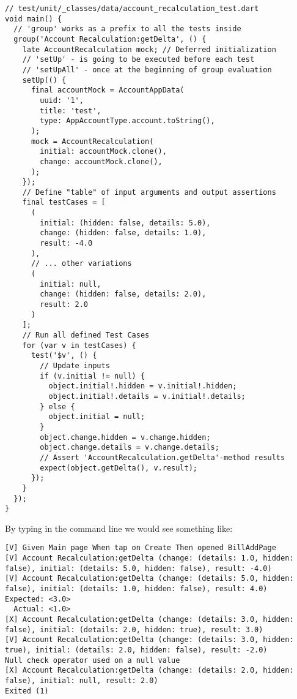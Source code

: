 \begin{lstlisting}
// test/unit/_classes/data/account_recalculation_test.dart 
void main() {
  // 'group' works as a prefix to all the tests inside
  group('Account Recalculation:getDelta', () {
    late AccountRecalculation mock; // Deferred initialization 
    // 'setUp' - is going to be executed before each test
    // 'setUpAll' - once at the beginning of group evaluation
    setUp(() {
      final accountMock = AccountAppData(
        uuid: '1',
        title: 'test',
        type: AppAccountType.account.toString(),
      );
      mock = AccountRecalculation(
        initial: accountMock.clone(),
        change: accountMock.clone(),
      );
    });
    // Define "table" of input arguments and output assertions
    final testCases = [
      (
        initial: (hidden: false, details: 5.0),
        change: (hidden: false, details: 1.0),
        result: -4.0
      ),
      // ... other variations
      (
        initial: null,
        change: (hidden: false, details: 2.0),
        result: 2.0
      )
    ];
    // Run all defined Test Cases
    for (var v in testCases) {
      test('$v', () {
        // Update inputs
        if (v.initial != null) {
          object.initial!.hidden = v.initial!.hidden;
          object.initial!.details = v.initial!.details;
        } else {
          object.initial = null;
        }
        object.change.hidden = v.change.hidden;
        object.change.details = v.change.details;
        // Assert 'AccountRecalculation.getDelta'-method results
        expect(object.getDelta(), v.result);
      });
    }
  });
}
\end{lstlisting}

\noindent By typing  in the command line we would see something like:

\begin{lstlisting}
[V] Given Main page When tap on Create Then opened BillAddPage
[V] Account Recalculation:getDelta (change: (details: 1.0, hidden: false), initial: (details: 5.0, hidden: false), result: -4.0)
[V] Account Recalculation:getDelta (change: (details: 5.0, hidden: false), initial: (details: 1.0, hidden: false), result: 4.0)
Expected: <3.0>
  Actual: <1.0>
[X] Account Recalculation:getDelta (change: (details: 3.0, hidden: false), initial: (details: 2.0, hidden: true), result: 3.0)
[V] Account Recalculation:getDelta (change: (details: 3.0, hidden: true), initial: (details: 2.0, hidden: false), result: -2.0)
Null check operator used on a null value
[X] Account Recalculation:getDelta (change: (details: 2.0, hidden: false), initial: null, result: 2.0)
Exited (1)
\end{lstlisting}

